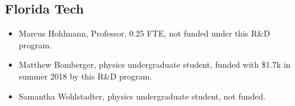 \subsection{Florida Tech} 

\begin{itemize}
\item Marcus Hohlmann, Professor, 0.25 FTE, not funded under this R\&D program.
\item Matthew Bomberger, physics undergraduate student, funded with \$1.7k in summer 2018 by this R\&D program.
\item Samantha Wohlstadter, physics undergraduate student, not funded.
\end{itemize}